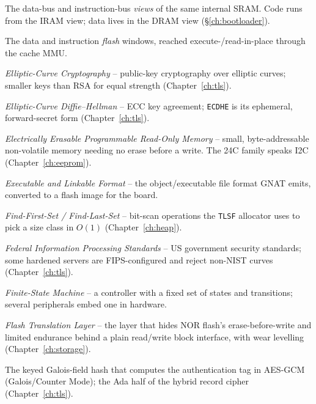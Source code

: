\begin{description}[style=nextline, leftmargin=0pt]
\item[DRAM / IRAM] The data-bus and instruction-bus \emph{views} of the same
  internal SRAM. Code runs from the IRAM view; data lives in the DRAM view
  (\S\ref{ch:bootloader}).

\item[DROM / IROM] The data and instruction \emph{flash} windows, reached
  execute-/read-in-place through the cache MMU.

\item[ECC] \emph{Elliptic-Curve Cryptography} -- public-key cryptography over elliptic curves; smaller keys than RSA for equal strength (Chapter~\ref{ch:tls}).

\item[ECDH] \emph{Elliptic-Curve Diffie--Hellman} -- ECC key agreement; \texttt{ECDHE} is its ephemeral, forward-secret form (Chapter~\ref{ch:tls}).

\item[EEPROM] \emph{Electrically Erasable Programmable Read-Only Memory} -- small, byte-addressable non-volatile memory needing no erase before a write. The 24C family speaks I2C (Chapter~\ref{ch:eeprom}).

\item[ELF] \emph{Executable and Linkable Format} -- the object/executable file format GNAT emits, converted to a flash image for the board.

\item[FFS / FLS] \emph{Find-First-Set / Find-Last-Set} -- bit-scan operations the \texttt{TLSF} allocator uses to pick a size class in $O(1)$ (Chapter~\ref{ch:heap}).

\item[FIPS] \emph{Federal Information Processing Standards} -- US government security standards; some hardened servers are FIPS-configured and reject non-NIST curves (Chapter~\ref{ch:tls}).

\item[FSM] \emph{Finite-State Machine} -- a controller with a fixed set of states and transitions; several peripherals embed one in hardware.

\item[FTL] \emph{Flash Translation Layer} -- the layer that hides NOR flash's erase-before-write and limited endurance behind a plain read/write block interface, with wear levelling (Chapter~\ref{ch:storage}).

\item[GHASH] The keyed Galois-field hash that computes the authentication tag in AES-GCM (Galois/Counter Mode); the Ada half of the hybrid record cipher (Chapter~\ref{ch:tls}).


\end{description}
